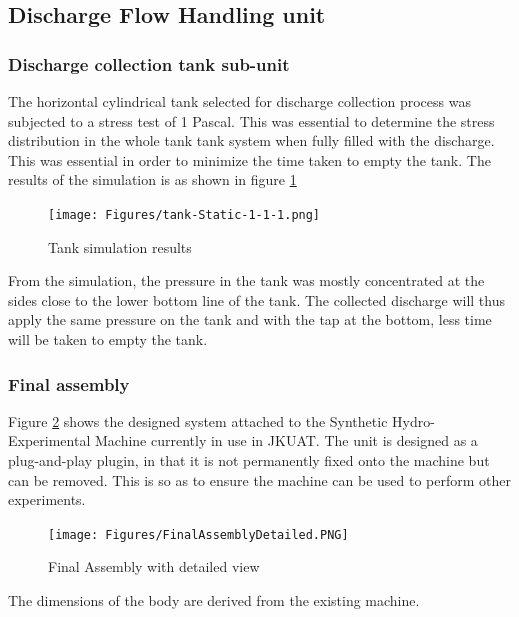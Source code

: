 \subsection{Discharge Flow Handling unit}
\subsubsection{Discharge collection tank sub-unit}
The horizontal cylindrical tank selected for discharge collection process was subjected to a stress test of 1 Pascal. This was essential to determine the stress distribution in the whole tank tank system when fully filled with the discharge. This was essential in order to minimize the time taken to empty the tank. The results of the simulation is as shown in figure \ref{fig:tank_simulation_results}
  \begin{figure}[H]
         \centering
         \texttt{[image: Figures/tank-Static-1-1-1.png]}
         \caption{Tank simulation results}
         \label{fig:tank_simulation_results}
     \end{figure}
\par
From the simulation, the pressure in the tank was mostly concentrated at the sides close to the lower bottom line of the tank. The collected discharge will thus apply the same pressure on the tank and with the tap at the bottom, less time will be taken to empty the tank.
\subsubsection{Final assembly}
Figure \ref{fig:final assembly} shows the designed system attached to the Synthetic Hydro-Experimental Machine currently in use in JKUAT. The unit is designed as a plug-and-play plugin, in that it is not permanently fixed onto the machine but can  be removed. This is so as to ensure the machine can be used to perform other experiments.
\begin{figure}[H]
    \centering
    \texttt{[image: Figures/FinalAssemblyDetailed.PNG]}
    \caption{Final Assembly with detailed view}
    \label{fig:final assembly}
\end{figure}
 The dimensions of the body are derived from the existing machine.
